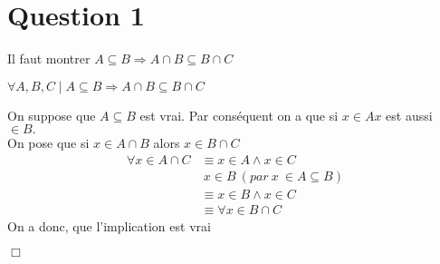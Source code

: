 \section*{Question 1}
{Il faut montrer $ A \subseteq B \Rightarrow A \cap B \subseteq B \cap C$}
\bigskip

\centerline{$\forall A,B,C \mid A \subseteq B \Rightarrow A \cap B \subseteq B \cap C$}
\bigskip
{On suppose que $A \subseteq B$ est vrai. Par conséquent on a que si $x \in A x$ est aussi $\in B.$\\
	On pose que si $x \in A \cap B$ alors $x \in B \cap C$}
\begin{align*}
	\forall x \in A \cap C &\equiv x \in A \wedge x \in C\\
	&\ x \in B\ (par\ x\ \in A \subseteq B)\\
	&\equiv x \in B \wedge x \in C\\
	&\equiv \forall x \in B \cap C
\end{align*}
\smallskip
{On a donc, que l'implication est vrai}
\begin{flushright}
	$\Box$
\end{flushright}